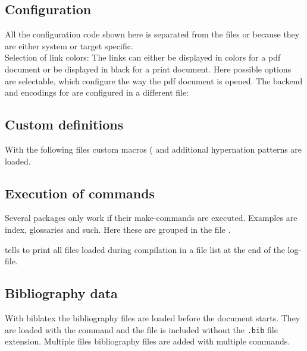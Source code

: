 \subsection{Configuration}
\label{sec:main:Configuration}
All the configuration code shown here is separated from the files  or  because they are either system or target specific.
\medskip\\\noindent
%
Selection of link colors: The links can either be displayed in colors for a pdf document or be displayed in black for a print document.
%
Here possible options are selectable, which configure the way the pdf document is opened.
%
The backend and encodings for  are configured in a different file:

\subsection{Custom definitions}
With the following files custom macros ( and additional hypernation patterns  are loaded. 

\subsection{Execution of commands}
\label{sec:ExecutionOfCommands}
Several packages only work if their make-commands are executed. Examples are index, glossaries and such. Here these are grouped in the file . 

 tells \latex to print all files loaded during compilation in a file list at the end of the log-file.
%

\subsection{Bibliography data}
With biblatex the bibliography files are loaded before the document starts. 
They are loaded with the command  and the file is included without the \texttt{.bib} file extension. Multiple files bibliography files are added with multiple  commands.

